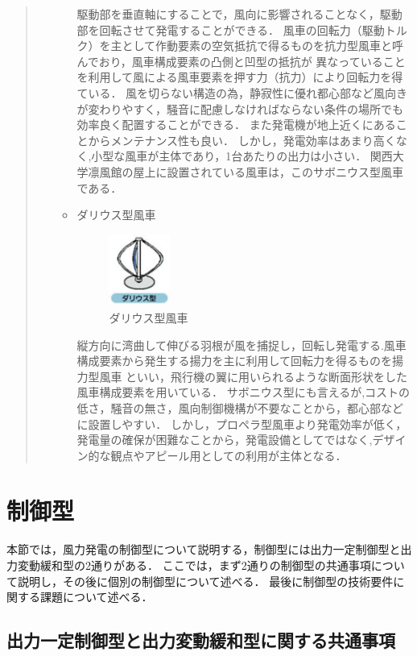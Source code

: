 \documentclass[a4paper,12pt,showkeys]{jreport}
\begin{document}
\begin{quotation}
\begin{itemize}
\begin{itemize}
駆動部を垂直軸にすることで，風向に影響されることなく，駆動部を回転させて発電することができる．
風車の回転力（駆動トルク）を主として作動要素の空気抵抗で得るものを抗力型風車と呼んでおり，風車構成要素の凸側と凹型の抵抗が
異なっていることを利用して風による風車要素を押す力（抗力）により回転力を得ている．
風を切らない構造の為，静寂性に優れ都心部など風向きが変わりやすく，騒音に配慮しなければならない条件の場所でも効率良く配置することができる．
また発電機が地上近くにあることからメンテナンス性も良い．
しかし，発電効率はあまり高くなく,小型な風車が主体であり，1台あたりの出力は小さい\cite{設備}．
関西大学凛風館の屋上に設置されている風車は，このサボニウス型風車である．

\item ダリウス型風車

\begin{figure}[h]
\centering
\includegraphics[width=2cm, clip]{fuusya3.eps}
\caption{ダリウス型風車}
\label{fig:fuusya2}
\end{figure}

縦方向に湾曲して伸びる羽根が風を捕捉し，回転し発電する.風車構成要素から発生する揚力を主に利用して回転力を得るものを揚力型風車
といい，飛行機の翼に用いられるような断面形状をした風車構成要素を用いている．
サボニウス型にも言えるが,コストの低さ，騒音の無さ，風向制御機構が不要なことから，都心部などに設置しやすい．
しかし，プロペラ型風車より発電効率が低く，発電量の確保が困難なことから，発電設備としてではなく,デザイン的な観点やアピール用としての利用が主体となる\cite{設備}．

\end{itemize}
\end{itemize}
\end{quotation}

\section{制御型}

本節では，風力発電の制御型について説明する，制御型には出力一定制御型と出力変動緩和型の2通りがある．
ここでは，まず2通りの制御型の共通事項について説明し，その後に個別の制御型について述べる．
最後に制御型の技術要件に関する課題について述べる．


\subsection{出力一定制御型と出力変動緩和型に関する共通事項}
\end{document}
